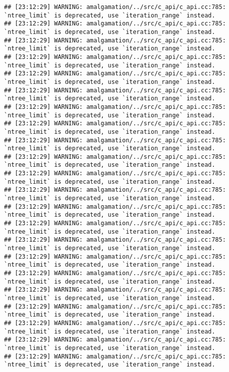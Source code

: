 \documentclass[
]{article}
\begin{document}
\begin{verbatim}
## [23:12:29] WARNING: amalgamation/../src/c_api/c_api.cc:785: `ntree_limit` is deprecated, use `iteration_range` instead.
## [23:12:29] WARNING: amalgamation/../src/c_api/c_api.cc:785: `ntree_limit` is deprecated, use `iteration_range` instead.
## [23:12:29] WARNING: amalgamation/../src/c_api/c_api.cc:785: `ntree_limit` is deprecated, use `iteration_range` instead.
## [23:12:29] WARNING: amalgamation/../src/c_api/c_api.cc:785: `ntree_limit` is deprecated, use `iteration_range` instead.
## [23:12:29] WARNING: amalgamation/../src/c_api/c_api.cc:785: `ntree_limit` is deprecated, use `iteration_range` instead.
## [23:12:29] WARNING: amalgamation/../src/c_api/c_api.cc:785: `ntree_limit` is deprecated, use `iteration_range` instead.
## [23:12:29] WARNING: amalgamation/../src/c_api/c_api.cc:785: `ntree_limit` is deprecated, use `iteration_range` instead.
## [23:12:29] WARNING: amalgamation/../src/c_api/c_api.cc:785: `ntree_limit` is deprecated, use `iteration_range` instead.
## [23:12:29] WARNING: amalgamation/../src/c_api/c_api.cc:785: `ntree_limit` is deprecated, use `iteration_range` instead.
## [23:12:29] WARNING: amalgamation/../src/c_api/c_api.cc:785: `ntree_limit` is deprecated, use `iteration_range` instead.
## [23:12:29] WARNING: amalgamation/../src/c_api/c_api.cc:785: `ntree_limit` is deprecated, use `iteration_range` instead.
## [23:12:29] WARNING: amalgamation/../src/c_api/c_api.cc:785: `ntree_limit` is deprecated, use `iteration_range` instead.
## [23:12:29] WARNING: amalgamation/../src/c_api/c_api.cc:785: `ntree_limit` is deprecated, use `iteration_range` instead.
## [23:12:29] WARNING: amalgamation/../src/c_api/c_api.cc:785: `ntree_limit` is deprecated, use `iteration_range` instead.
## [23:12:29] WARNING: amalgamation/../src/c_api/c_api.cc:785: `ntree_limit` is deprecated, use `iteration_range` instead.
## [23:12:29] WARNING: amalgamation/../src/c_api/c_api.cc:785: `ntree_limit` is deprecated, use `iteration_range` instead.
## [23:12:29] WARNING: amalgamation/../src/c_api/c_api.cc:785: `ntree_limit` is deprecated, use `iteration_range` instead.
## [23:12:29] WARNING: amalgamation/../src/c_api/c_api.cc:785: `ntree_limit` is deprecated, use `iteration_range` instead.
## [23:12:29] WARNING: amalgamation/../src/c_api/c_api.cc:785: `ntree_limit` is deprecated, use `iteration_range` instead.
## [23:12:29] WARNING: amalgamation/../src/c_api/c_api.cc:785: `ntree_limit` is deprecated, use `iteration_range` instead.
## [23:12:29] WARNING: amalgamation/../src/c_api/c_api.cc:785: `ntree_limit` is deprecated, use `iteration_range` instead.
## [23:12:29] WARNING: amalgamation/../src/c_api/c_api.cc:785: `ntree_limit` is deprecated, use `iteration_range` instead.

\end{verbatim}
\end{document}

